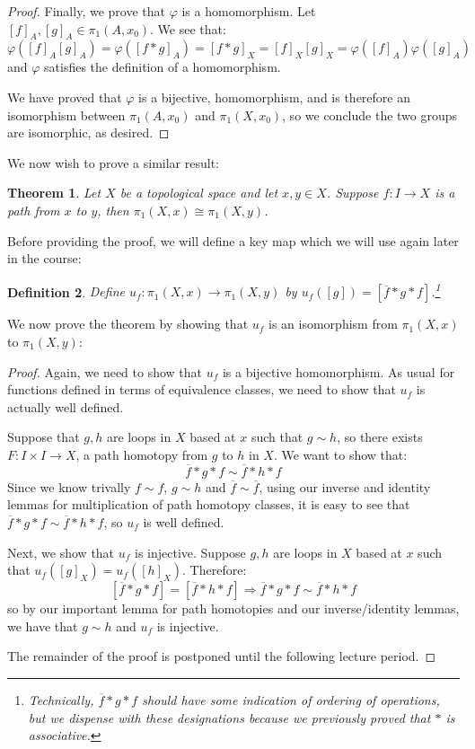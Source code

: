 \documentclass[reqno]{amsart}
\newtheorem{theorem}{Theorem}
\newtheorem{definition}[theorem]{Definition}
\begin{document}
\begin{proof}
Finally, we prove that $\varphi$ is a homomorphism. Let $[f]_A,[g]_A\in \pi_1(A,x_0)$. We see that:
\[\varphi([f]_A[g]_A) =  \varphi([f*g]_A) = [f*g]_X = [f]_X [g]_X = \varphi([f]_A)\varphi([g]_A)\]
and $\varphi$ satisfies the definition of a homomorphism.

We have proved that $\varphi$ is a bijective, homomorphism, and is therefore an isomorphism between $\pi_1(A,x_0)$ and $\pi_1(X,x_0)$, so we conclude the two groups are isomorphic, as desired.
\end{proof}

We now wish to prove a similar result:
\begin{theorem}
Let $X$ be a topological space and let $x,y\in X$. Suppose $f:I\to X$ is a path from $x$ to $y$, then $\pi_1(X,x)\cong \pi_1(X,y)$. 
\end{theorem}

Before providing the proof, we will define a key map which we will use again later in the course:
\begin{definition}
Define $u_f:\pi_1(X,x)\to \pi_1(X,y)$ by $u_f([g]) = [\overline{f}*g*f]$.\footnote{Technically, $\overline{f}*g*f$ should have some indication of ordering of operations, but we dispense with these designations because we previously proved that $*$ is associative.}
\end{definition}
We now prove the theorem by showing that $u_f$ is an isomorphism from $\pi_1(X,x)$ to $\pi_1(X,y)$:
\begin{proof}
Again, we need to show that $u_f$ is a bijective homomorphism. As usual for functions defined in terms of equivalence classes, we need to show that $u_f$ is actually well defined. 

Suppose that $g,h$ are loops in $X$ based at $x$ such that $g\sim h$, so there exists $F:I\times I\to X$, a path homotopy from $g$ to $h$ in $X$. We want to show that:
\[\overline{f}*g*f \sim \overline{f}*h*f\]
Since we know trivally $f\sim f$, $g\sim h$ and $\overline{f}\sim\overline{f}$, using our inverse and identity lemmas for multiplication of path homotopy classes, it is easy to see that $\overline{f}*g*f \sim \overline{f}*h*f$, so $u_f$ is well defined.

Next, we show that $u_f$ is injective. Suppose $g,h$ are loops in $X$ based at $x$ such that $u_f([g]_X) = u_f([h]_X)$. Therefore:
\[[\overline{f}*g*f] = [\overline{f}*h*f] \Rightarrow \overline{f}*g*f\sim \overline{f}*h*f\]
so by our important lemma for path homotopies and our inverse/identity lemmas, we have that $g\sim h$ and $u_f$ is injective.

The remainder of the proof is postponed until the following lecture period.
\end{proof}
\end{document}
